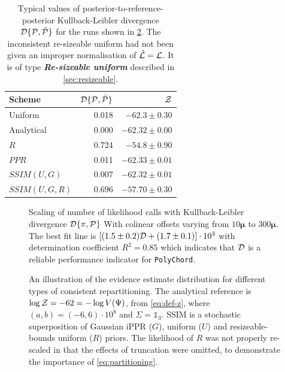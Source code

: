 \documentclass[usenatbib]{mnras}
\begin{document}
\begin{table}
  \centering
  
  \caption{Typical values of posterior-to-reference-posterior
    Kullback-Leibler divergence ${\cal D}\{{\cal P}, \bar{\cal P}\}$
    for the runs shown in \cref{fig:hist}. The inconsistent
    re-sizeable uniform had not been given an improper normalisation
    of $\hat{\cal L} = {\cal L}$. It is of type \textbf{\emph{Re-sizeable
      uniform}} described in \cref{sec:resizeable}.}
  \begin{tabular}{lrr}
    \textbf{Scheme} & ${\cal D}\{ {\cal P}, \bar{\cal P}\}$ & ${\cal Z}$\\
    \hline
    Uniform & 0.018 & \(-62.3 \pm 0.30\)\\
    Analytical & 0.000 & \(-62.32 \pm 0.00\) \\
    $R$ & 0.724 & \(-54.8 \pm 0.90\)\\
    $PPR$ & 0.011 & \(-62.33 \pm 0.01\)\\
    $SSIM(U, G)$ & 0.007 & \(-62.32 \pm 0.01\)\\
    $SSIM(U, G, R)$ & 0.696 & \(-57.70 \pm 0.30\)\\
  \end{tabular}
  \label{tab:hist}
\end{table}


\begin{figure}
  
  \caption{Scaling of number of likelihood calls with Kullback-Leibler
    divergence \({\cal D}\{ \pi, {\cal P}\}\) With colinear offsets
    varying from $10\bm{\mu}$ to $300\bm{\mu}$. The best fit line is
    \(\left[(1.5 \pm 0.2) {\cal D} + (1.7 \pm 0.1)\right]\cdot 10^3 \)
    with determination coefficient \(R^{2} = 0.85\) which indicates
    that \({\cal D}\) is a reliable performance indicator for
    \texttt{PolyChord}.\label{fig:kl-scaling}}
\end{figure}


\begin{figure}

\caption{An illustration of the evidence estimate distribution for
  different types of consistent repartitioning. The analytical
  reference is \(\log {\cal Z} = -62 = - \log V(\Psi)\), from
  \cref{eq:def-z}, where \((a,b)=(-6, 6)\cdot 10^{8}\) and
  \(\Sigma=\mathds{1}_{3}\). SSIM is a stochastic superposition of
  Gaussian iPPR (\(G\)), uniform (\(U\)) and resizeable-bounds uniform
  (\(R\)) priors. The likelihood of \(R\) was not properly re-scaled
  in that the effects of truncation were omitted, to demonstrate the
  importance of \cref{eq:partitioning}. \label{fig:hist}}
\end{figure}
\end{document}
